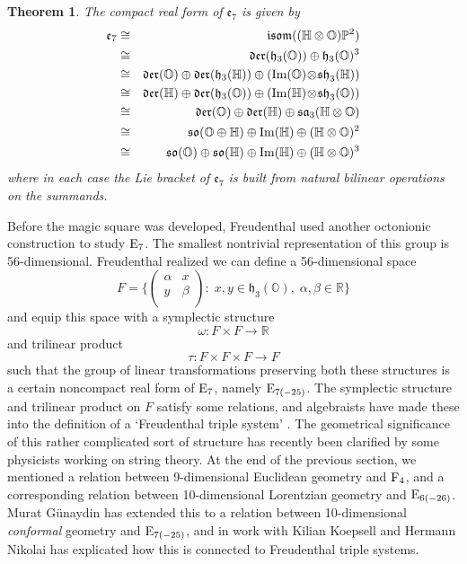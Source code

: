 \documentclass[12pt]{article}
\newcommand\R{{\mathbb R}}
\renewcommand\H{{\mathbb H}}
\renewcommand\O{{\mathbb O}}
\renewcommand\P{{\mathbb P}}
\newcommand{\E}{{\rm E}}
\newcommand{\F}{{\rm F}}
\newcommand{\so}{{\mathfrak {so}}}
\newcommand{\e}{{\mathfrak {e}}}
\newcommand{\sa}{{\mathfrak {sa}}}
\newcommand{\h}{{\mathfrak {h}}}
\newcommand{\sh}{{\mathfrak {sh}}}
\newcommand{\isom}{{\mathfrak {isom}}}
\newcommand{\Der}{{\mathfrak {der}}}
\newcommand{\et}{\hspace{-0.08in}{\bf .}\hspace{0.1in}}
\renewcommand{\Im}{{\rm Im}}
\newcommand{\tensor}{\otimes}
\newcommand{\iso}{\cong}
\newcommand{\ban}{\begin{eqnarray*}}
\newcommand{\ean}{\end{eqnarray*}}
\newcommand{\maps}{\colon}
\newtheorem{thm}{Theorem}
\begin{document}
\begin{thm} \et \label{e7-description}  The compact real form of    
$\e_7$ is given by    
\ban   
\e_7  &\iso& \isom((\H \tensor \O)\P^2)    \\   
&\iso& \Der(\h_3(\O)) \oplus \h_3(\O)^3   \\   
&\iso& \Der(\O) \oplus \Der(\h_3(\H)) \oplus    
       (\Im(\O) \!\tensor \! \sh_3(\H)) \\   
&\iso& \Der(\H) \oplus \Der(\h_3(\O)) \oplus    
        (\Im(\H) \! \tensor\! \sh_3(\O)) \\   
&\iso& \Der(\O) \oplus \Der(\H) \oplus \sa_3(\H \tensor \O) \\   
&\iso& \so(\O \oplus \H) \oplus \Im(\H) \oplus (\H \tensor \O)^2 \\   
&\iso& \so(\O) \oplus \so(\H) \oplus \Im(\H) \oplus (\H \tensor \O)^3  
\ean   
where in each case the Lie bracket of $\e_7$ is built from    
natural bilinear operations on the summands.     
\end{thm}   

Before the magic square was developed, Freudenthal \cite{Freudenthal2} 
used another octonionic construction to study $\E_7$.   The smallest
nontrivial representation of this group is 56-dimensional.  Freudenthal
realized we can define a 56-dimensional space 
\[ F = \{ \left( \begin{array}{cc}  
                         \alpha  & x     \\  
                          y      & \beta \\ 
\end{array} \right) : \;
x,y \in \h_3(\O) , \; \alpha , \beta \in \R \} 
\] 
and equip this space with a symplectic structure 
\[     \omega \maps F \times F \to \R  \]
and trilinear product 
\[     \tau \maps F \times F \times F \to F \]
such that the group of linear transformations preserving both these
structures is a certain noncompact real form of $\E_7$, namely
$\E_{7(-25)}$.  The symplectic structure and trilinear product on
$F$ satisfy some relations, and algebraists have made these into the
definition of a `Freudenthal triple system' \cite{Brown,Faulkner,Meyberg}.
The geometrical significance of this rather complicated sort of structure 
has recently been clarified by some physicists working on string theory.
At the end of the previous section, we
mentioned a relation between 9-dimensional Euclidean geometry and
$\F_4$, and a corresponding relation between 10-dimensional Lorentzian
geometry and $\E_{6(-26)}$.  Murat G\"unaydin \cite{Gunaydin} has 
extended this to a relation between 10-dimensional {\sl conformal} 
geometry and $\E_{7(-25)}$, and in work with Kilian Koepsell 
and Hermann Nikolai \cite{GKN} has explicated how this is connected 
to Freudenthal triple systems.  
\end{document}
